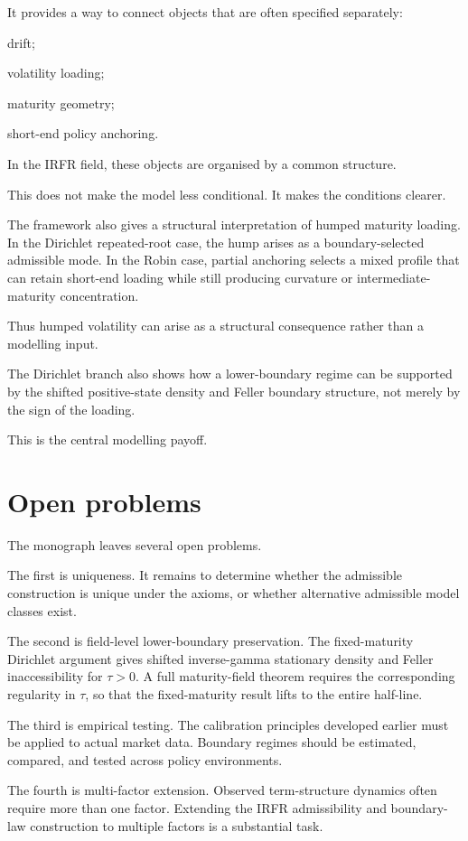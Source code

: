 \documentclass[11pt,oneside]{book}
\begin{document}
It provides a way to connect objects that are often specified
separately:

drift;

volatility loading;

maturity geometry;

short-end policy anchoring.

In the IRFR field, these objects are organised by a common structure.

This does not make the model less conditional. It makes the conditions
clearer.

The framework also gives a structural interpretation of humped maturity
loading. In the Dirichlet repeated-root case, the hump arises as a
boundary-selected admissible mode. In the Robin case, partial anchoring
selects a mixed profile that can retain short-end loading while still
producing curvature or intermediate-maturity concentration.

Thus humped volatility can arise as a structural consequence rather than
a modelling input.

The Dirichlet branch also shows how a lower-boundary regime can be
supported by the shifted positive-state density and Feller boundary
structure, not merely by the sign of the loading.

This is the central modelling payoff.

\section{Open problems}\label{open-problems}

The monograph leaves several open problems.

The first is uniqueness. It remains to determine whether the admissible
construction is unique under the axioms, or whether alternative
admissible model classes exist.

The second is field-level lower-boundary preservation. The
fixed-maturity Dirichlet argument gives shifted inverse-gamma stationary
density and Feller inaccessibility for $\tau>0$. A full
maturity-field theorem requires the corresponding regularity in $\tau$, so
that the fixed-maturity result lifts to the entire half-line.

The third is empirical testing. The calibration principles developed
earlier must be applied to actual market data. Boundary regimes should
be estimated, compared, and tested across policy environments.

The fourth is multi-factor extension. Observed term-structure dynamics
often require more than one factor. Extending the IRFR admissibility and
boundary-law construction to multiple factors is a substantial task.
\end{document}
